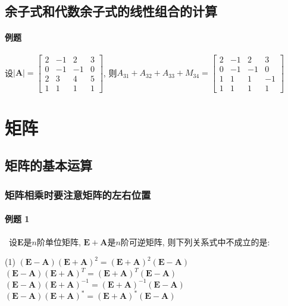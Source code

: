 \subsection{余子式和代数余子式的线性组合的计算}\label{余子式和代数余子式的线性组合的计算}
\vspace{1em}
\paragraph{例题} 设$\bm{|A|}=
\begin{bmatrix}
2 & -1 & 2 & 3 \\
0 & -1 & -1 & 0 \\
2 & 3 & 4 & 5 \\
1 & 1 & 1 & 1
\end{bmatrix}
$, 则$A_{31}+A_{32}+A_{33}+M_{34}=
\begin{bmatrix}
2 & -1 & 2 & 3 \\
0 & -1 & -1 & 0 \\
1 & 1 & 1 & -1 \\
1 & 1 & 1 & 1
\end{bmatrix}
$
\section{矩阵}
\subsection{矩阵的基本运算}
\subsubsection{矩阵相乘时要注意矩阵的左右位置}\label{矩阵相乘时要注意矩阵的左右位置}
\paragraph{例题 1}~设$ \bm{E} $是$ n $阶单位矩阵, $ \bm{E}+\bm{A} $是$ n $阶可逆矩阵, 则下列关系式中不成立的是:
\begin{tasks}[label-offset={0.8em},label-format={\bfseries}](1)
\task $ (\bm{E}-\bm{A})(\bm{E}+\bm{A})^{2}=(\bm{E}+\bm{A})^{2}(\bm{E}-\bm{A}) $
\task $ (\bm{E}-\bm{A})(\bm{E}+\bm{A})^{T}=(\bm{E}+\bm{A})^{T}(\bm{E}-\bm{A}) $
\task $ (\bm{E}-\bm{A})(\bm{E}+\bm{A})^{-1}=(\bm{E}+\bm{A})^{-1}(\bm{E}-\bm{A}) $
\task $ (\bm{E}-\bm{A})(\bm{E}+\bm{A})^{*}=(\bm{E}+\bm{A})^{*}(\bm{E}-\bm{A}) $
\end{tasks} \par
